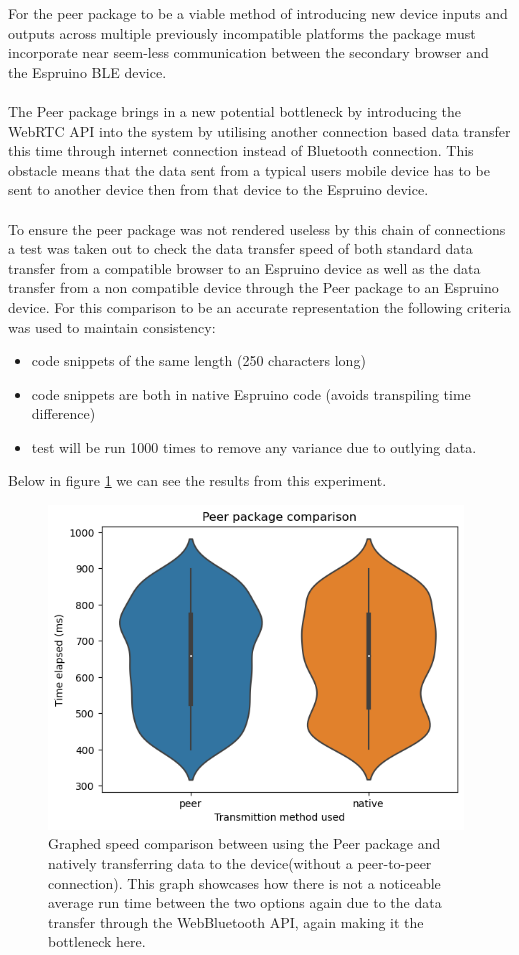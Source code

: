 \documentclass{l4proj}
\begin{document}
For the peer package to be a viable method of introducing new device inputs and outputs across multiple previously incompatible platforms the package must incorporate near seem-less communication between the secondary browser and the Espruino BLE device.
\\ \\
The Peer package brings in a new potential bottleneck by introducing the WebRTC API into the system by utilising another connection based data transfer this time through internet connection instead of Bluetooth connection. This obstacle means that the data sent from a typical users mobile device has to be sent to another device then from that device to the Espruino device.
\\ \\ 
To ensure the peer package was not rendered useless by this chain of connections a test was taken out to check the data transfer speed of both standard data transfer from a compatible browser to an Espruino device as well as the data transfer from a non compatible device through the Peer package to an Espruino device. For this comparison to be an accurate representation the following criteria was used to maintain consistency:

\begin{itemize}
    \item code snippets of the same length (250 characters long)
    \item code snippets are both in native Espruino code (avoids transpiling time difference)
    \item test will be run 1000 times to remove any variance due to outlying data.
\end{itemize}

Below in figure \ref{fig:peer-native-speed-comparison} we can see the results from this experiment.


\begin{figure}[H]
    \centering
    \includegraphics[width=11cm]{dissertation/images/peer-native-comparison.png}
    \caption{Graphed speed comparison between using the Peer package and natively transferring data to the device(without a peer-to-peer connection). This graph showcases how there is not a noticeable average run time between the two options again due to the data transfer through the WebBluetooth API, again making it the bottleneck here.}
    \label{fig:peer-native-speed-comparison}
\end{figure}
\end{document}
